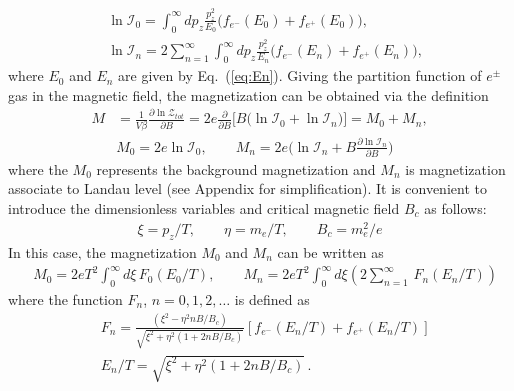 \documentclass[sn-mathphys,Numbered]{sn-jnl}
\newcommand{\req}[1]{Eq.~(\ref{#1})}
\begin{document}
\begin{align}
&\ln\mathcal{I}_{0}=\int_0^\infty\!\!dp_z \frac{p_z^2}{E_0}\bigg(f_{e^-}(E_0)+f_{e^+}(E_0)\bigg), \\
&\ln\mathcal{I}_{n}=2 \sum_{n=1}^\infty\int_0^\infty\!\!dp_z \frac{p_z^2}{E_{n}}\bigg(f_{e^-}(E_n)+f_{e^+}(E_n)\bigg),
\end{align}
where $E_0$ and $E_n$ are given by \req{eq:En}. Giving the partition function of $e^\pm$ gas in the magnetic field, the magnetization can be obtained via the definition
\begin{align}
M&=\frac{1}{V\beta}\frac{\partial \ln \mathcal{Z}_{tot}}{\partial B}=2e\frac{\partial}{\partial B}\bigg[B\bigg(\ln\mathcal{I}_{0}+\ln\mathcal{I}_{n}\bigg)\bigg]=M_0+M_n,\\
&M_0=2e\ln\mathcal{I}_{0},\qquad
\label{M_landau}
M_n=2e\bigg(\ln\mathcal{I}_{n}+B\frac{\partial\ln\mathcal{I}_n}{\partial B}\bigg)
\end{align}
where the $M_0$ represents the background magnetization  and $M_n$ is magnetization associate to Landau level (see Appendix for simplification). It is convenient to introduce the dimensionless variables and critical magnetic field $B_c$ as follows:
\begin{align}
\xi=p_z/T,\qquad \eta=m_e/T,\qquad B_c=m^2_e/e
\end{align}
In this case, the magnetization $M_0$ and $M_n$ can be written as
\begin{align}
&M_0=2eT^2\int_0^\infty\!\!d\xi\, F_0(E_0/T),\qquad M_n=2eT^2\int_{0}^\infty\!\!d\xi\left(2\sum_{n=1}^\infty\,F_n(E_n/T)\right)
\end{align}
where the function $F_n$, $n=0,1,2,\ldots$ is defined as
\begin{align}
&F_n=\frac{(\xi^2-\eta^2nB/B_c)}{\sqrt{\xi^2+\eta^2\left(1+2nB/B_c\right)}}\left[f_{e^-}(E_n/T)+f_{e^+}(E_n/T)\right]\\
&E_n/T=\sqrt{\xi^2+\eta^2\left(1+2nB/B_c\right)}\,.
\end{align}
\end{document}
